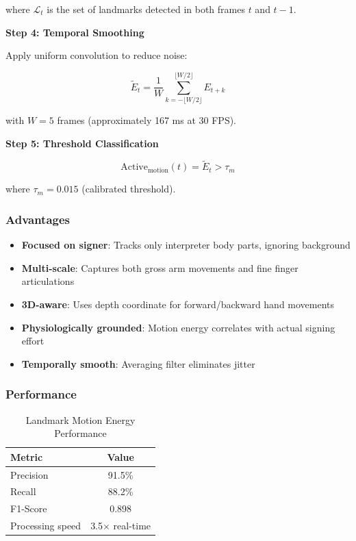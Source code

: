 \documentclass[11pt,a4paper]{article}
\begin{document}
where $\mathcal{L}_t$ is the set of landmarks detected in both frames $t$ and $t-1$.

\textbf{Step 4: Temporal Smoothing}

Apply uniform convolution to reduce noise:

\begin{equation}
\tilde{E}_t = \frac{1}{W} \sum_{k=-\lfloor W/2 \rfloor}^{\lfloor W/2 \rfloor} E_{t+k}
\end{equation}

with $W = 5$ frames (approximately 167 ms at 30 FPS).

\textbf{Step 5: Threshold Classification}

\begin{equation}
\text{Active}_{\text{motion}}(t) = \tilde{E}_t > \tau_m
\end{equation}

where $\tau_m = 0.015$ (calibrated threshold).

\subsubsection{Advantages}

\begin{itemize}
    \item \textbf{Focused on signer}: Tracks only interpreter body parts, ignoring background
    \item \textbf{Multi-scale}: Captures both gross arm movements and fine finger articulations
    \item \textbf{3D-aware}: Uses depth coordinate for forward/backward hand movements
    \item \textbf{Physiologically grounded}: Motion energy correlates with actual signing effort
    \item \textbf{Temporally smooth}: Averaging filter eliminates jitter
\end{itemize}

\subsubsection{Performance}

\begin{table}[htbp]
\centering
\caption{Landmark Motion Energy Performance}
\begin{tabular}{@{}lc@{}}
\toprule
\textbf{Metric} & \textbf{Value} \\ \midrule
Precision & 91.5\% \\
Recall & 88.2\% \\
F1-Score & 0.898 \\
Processing speed & 3.5$\times$ real-time \\
\bottomrule
\end{tabular}
\end{table}
\end{document}
